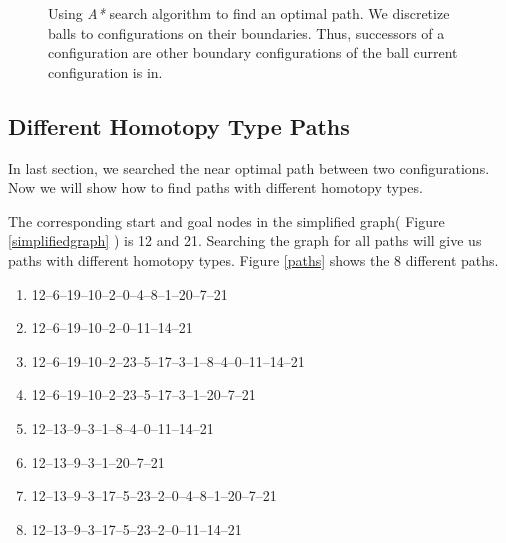 \documentclass[11pt]{article}
\begin{document}
\begin{figure}
	\caption{\label{Astar}} Using \emph{A*} search algorithm to find an optimal path. We discretize balls to configurations on their boundaries. Thus, successors of a configuration are other boundary configurations of the ball current configuration is in. 
\end{figure}

\subsection{Different Homotopy Type Paths }
\indent\indent In last section, we searched the near optimal path between two configurations. Now we will show how to find paths with different homotopy types.

\indent The corresponding start and goal nodes in the simplified graph( Figure \ref{simplifiedgraph} ) is 12 and 21. Searching the graph for all paths will give us paths with different homotopy types. Figure \ref{paths} shows the 8 different paths.

\begin{enumerate}
	\item 12--6--19--10--2--0--4--8--1--20--7--21	
	\item 12--6--19--10--2--0--11--14--21	
	\item 12--6--19--10--2--23--5--17--3--1--8--4--0--11--14--21	
	\item 12--6--19--10--2--23--5--17--3--1--20--7--21	
	\item 12--13--9--3--1--8--4--0--11--14--21	
	\item 12--13--9--3--1--20--7--21	
	\item 12--13--9--3--17--5--23--2--0--4--8--1--20--7--21	
	\item	12--13--9--3--17--5--23--2--0--11--14--21	
\end{enumerate}
\end{document}

